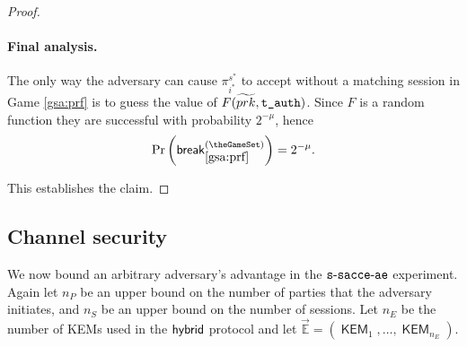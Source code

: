\documentclass[USenglish,oneside,twocolumn]{article}
\theoremstyle{dgthm}
\theoremstyle{dgdef}
\newcounter{GameSet}
\newcommand{\hybrid}{{\sf {hybrid}}}
\newcommand{\AlgorithmName}[1]{\operatorname{\mathsf{#1}}}
\newcommand{\p}[2]{\pi_{#1}^{#2}}
\newcommand{\Token}[1]{\textnormal{\tt{#1}}}
\newcommand{\brk}[1]{\mathsf{break}_{#1}^{(\theGameSet)}}
\newcommand{\Prb}[1]{\mathrm{Pr}\left(\brk{#1}\right)}
\newcommand{\Experiment}[1]{\operatorname{\tt{#1}}}
\begin{document}
\begin{proof}
  \paragraph*{Final analysis.}
    The only way the adversary can cause $\p{i^*}{s^*}$ to accept without a
    matching session in Game \ref{gsa:prf} is to guess the value of
    $F(\widetilde{prk}, \Token{t\_auth})$. Since $F$ is a random function they
    are successful with probability $2^{-\mu}$, hence
    \begin{equation}\label{eq:gsa:prf}
      \Prb{\ref{gsa:prf}} = 2^{-\mu}.
    \end{equation}

    This establishes the claim.
\end{proof}


\subsection{Channel security}

  We now bound an arbitrary adversary's advantage in the $\Experiment{s-sacce-ae}$ experiment.
  Again let $n_P$ be an upper bound on the number of parties that the adversary initiates, and
  $n_S$ be an upper bound on the number of sessions. Let $n_E$ be the number of KEMs used in
  the $\hybrid$ protocol and let $\vec{\mathbb{E}} = (\AlgorithmName{KEM}_1, \dots, \AlgorithmName{KEM}_{n_E})$.
\end{document}
